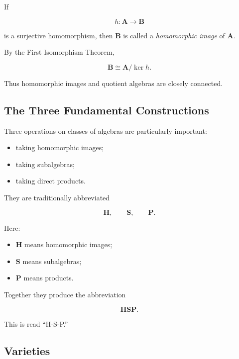 If

\[ h:\mathbf A\to\mathbf B \]

is a surjective homomorphism, then \(\mathbf B\) is called a
\emph{homomorphic image} of \(\mathbf A\).

By the First Isomorphism Theorem,

\[ \mathbf B\cong\mathbf A/\ker h. \]

Thus homomorphic images and quotient algebras are closely connected.

\subsection{The Three Fundamental Constructions}
\label{subsec:hsp-constructions}

Three operations on classes of algebras are particularly important:

\begin{itemize}
    \item taking homomorphic images;
    \item taking subalgebras;
    \item taking direct products.
\end{itemize}

They are traditionally abbreviated

\[ \mathbf H,\qquad\mathbf S,\qquad\mathbf P. \]

Here:

\begin{itemize}
    \item \(\mathbf H\) means homomorphic images;
    \item \(\mathbf S\) means subalgebras;
    \item \(\mathbf P\) means products.
\end{itemize}

Together they produce the abbreviation

\[ \mathbf{HSP}. \]

This is read ``H-S-P.''

\subsection{Varieties}
\label{subsec:universal-varieties}

